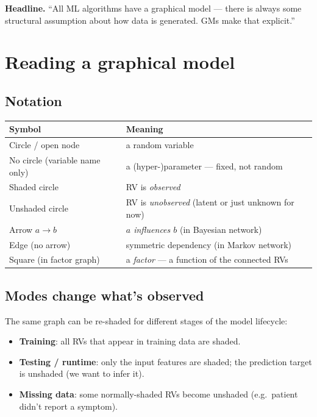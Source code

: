 \documentclass[11pt, a4paper]{article}
\newcommand{\thead}[1]{\textbf{#1}}
\begin{document}
\textbf{Headline.} ``All ML algorithms have a graphical model — there is always some structural assumption about how data is generated. GMs make that explicit.''

\section{Reading a graphical model}

\subsection{Notation}

\begin{tabularx}{\linewidth}{@{}lX@{}}
\toprule
\thead{Symbol} & \thead{Meaning} \\
\midrule
Circle / open node           & a random variable \\
No circle (variable name only) & a (hyper-)parameter — fixed, not random \\
Shaded circle                & RV is \emph{observed} \\
Unshaded circle              & RV is \emph{unobserved} (latent or just unknown for now) \\
Arrow $a \to b$              & \emph{$a$ influences $b$} (in Bayesian network) \\
Edge (no arrow)              & symmetric dependency (in Markov network) \\
Square (in factor graph)     & a \emph{factor} — a function of the connected RVs \\
\bottomrule
\end{tabularx}

\subsection{Modes change what's observed}

The same graph can be re-shaded for different stages of the model lifecycle:

\begin{itemize}
  \item \textbf{Training}: all RVs that appear in training data are shaded.
  \item \textbf{Testing / runtime}: only the input features are shaded; the prediction target is unshaded (we want to infer it).
  \item \textbf{Missing data}: some normally-shaded RVs become unshaded (e.g.\ patient didn't report a symptom).
\end{itemize}
\end{document}
